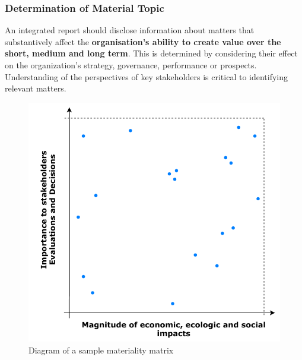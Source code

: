 \documentclass[11pt]{article}
\theoremstyle{definition}
\begin{document}
\subsubsection{Determination of Material Topic}
An integrated report should disclose information about matters that substantively affect the \textbf{organisation's ability to create value over the short, medium and long term}. This is determined by considering their effect on the organization's strategy, governance, performance or prospects. Understanding of the perspectives of key stakeholders is critical to identifying relevant matters.

\begin{figure}[H]
	\centering
	\includegraphics[width=0.6\linewidth]{img/materiality_matrix}
	\caption{Diagram of a sample materiality matrix}
\end{figure}
\end{document}
